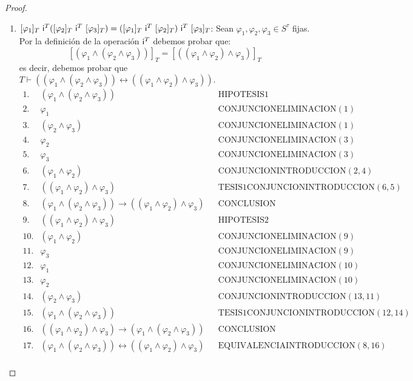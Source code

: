\begin{proof}
\begin{enumerate}[(1)]
      \item $[\varphi_{1}]_{T} \ \IN^{T}([\varphi_{2}]_{T} \ \IN^{T} \ [\varphi_{3}]_{T}) = ([\varphi_{1}]_{T} \ \IN^{T}
        \ [\varphi_{2}]_{T}) \ \IN^{T} \ [\varphi_{3}]_{T}$: Sean $\varphi_{1}, \varphi_{2}, \varphi_{3} \in
        S^{\tau}$ fijas. Por la definición de la operación $\mathsf{i}^{T}$ debemos probar que:
        \[
          [(\varphi_{1} \wedge (\varphi_{2} \wedge \varphi_{3}))]_{T} = [((\varphi_{1} \wedge \varphi_{2}) \wedge
          \varphi_{3})]_{T}
        \]
        \PN es decir, debemos probar que $T \vdash ((\varphi_{1} \wedge (\varphi_{2} \wedge \varphi_{3}))
        \leftrightarrow ((\varphi_{1} \wedge \varphi_{2}) \wedge \varphi_{3}))$.
        \[
          \begin{array}{llll}
            1. & (\varphi_{1} \wedge (\varphi_{2} \wedge \varphi_{3})) && \text{HIPOTESIS1} \\
            2. & \varphi_{1} && \text{CONJUNCIONELIMINACION}(1) \\
            3. & (\varphi_{2} \wedge \varphi_{3}) && \text{CONJUNCIONELIMINACION}(1) \\
            4. & \varphi_{2} && \text{CONJUNCIONELIMINACION}(3) \\
            5. & \varphi_{3} && \text{CONJUNCIONELIMINACION}(3) \\
            6. & (\varphi_{1} \wedge \varphi_{2}) && \text{CONJUNCIONINTRODUCCION}(2,4) \\
            7. & ((\varphi_{1} \wedge \varphi_{2}) \wedge \varphi_{3}) && \text{TESIS1CONJUNCIONINTRODUCCION}(6,5) \\
            8. & (\varphi_{1} \wedge (\varphi_{2} \wedge \varphi_{3})) \rightarrow ((\varphi_{1} \wedge \varphi_{2})
              \wedge \varphi_{3}) && \text{CONCLUSION} \\
            9. & ((\varphi_{1} \wedge \varphi_{2}) \wedge \varphi_{3}) && \text{HIPOTESIS2} \\
            10. & (\varphi_{1} \wedge \varphi_{2}) && \text{CONJUNCIONELIMINACION}(9) \\
            11. & \varphi_{3} && \text{CONJUNCIONELIMINACION}(9) \\
            12. & \varphi_{1} && \text{CONJUNCIONELIMINACION}(10) \\
            13. & \varphi_{2} && \text{CONJUNCIONELIMINACION}(10) \\
            14. & (\varphi_{2} \wedge \varphi_{3}) && \text{CONJUNCIONINTRODUCCION}(13,11) \\
            15. & (\varphi_{1} \wedge (\varphi_{2} \wedge \varphi_{3})) && \text{TESIS1CONJUNCIONINTRODUCCION}(12,14) \\
            16. & ((\varphi_{1} \wedge \varphi_{2}) \wedge \varphi_{3}) \rightarrow (\varphi_{1} \wedge (\varphi_{2}
              \wedge \varphi_{3})) && \text{CONCLUSION} \\
            17. & (\varphi_{1} \wedge (\varphi_{2} \wedge \varphi_{3})) \leftrightarrow ((\varphi_{1} \wedge
              \varphi_{2}) \wedge \varphi_{3}) && \text{EQUIVALENCIAINTRODUCCION}(8,16) \\
          \end{array}
        \]


\end{enumerate}
\end{proof}
